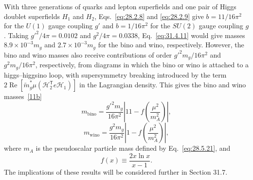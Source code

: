 With three generations of quarks and lepton superfields and one pair of
Higgs doublet superfields \(H_1\) and \(H_2\),
Eqs.~\eqref{eq:28.2.8} and \eqref{eq:28.2.9} give \(b=11/16\pi^2\) for
the \(U(1)\) gauge coupling \(g'\) and \(b=1/16\pi^2\) for the \(SU(2)\)
gauge coupling \(g\). Taking \(g'^2/4\pi=0.0102\) and
\(g^2/4\pi=0.0338\), Eq.~\eqref{eq:31.4.11} would give masses
\(8.9\times10^{-3}m_g\) and \(2.7\times10^{-3}m_g\) for the bino and
wino, respectively. However, the bino and wino masses also receive
contributions of order \(g'^2m_g/16\pi^2\) and \(g^2m_g/16\pi^2\),
respectively, from diagrams in which the bino or wino is attached to a
higgs--higgsino loop, with supersymmetry breaking introduced by the term
\(2\operatorname{Re}
[\widetilde m_g^*\mu(\mathcal H_2^{\mathsf T}e\mathcal H_1)]\)
in the Lagrangian density. This gives the bino and wino
masses~\hyperref[ch31-ref-11b]{[11b]}
\begin{equation}
  m_{\mathrm{bino}}
  =\frac{g'^2m_g}{16\pi^2}
   \left|11-f\left(\frac{\mu^2}{m_A^2}\right)\right|,
  \tag{31.4.15}\label{eq:31.4.15}
\end{equation}
\begin{equation}
  m_{\mathrm{wino}}
  =\frac{g^2m_g}{16\pi^2}
   \left|1-f\left(\frac{\mu^2}{m_A^2}\right)\right|,
  \tag{31.4.16}\label{eq:31.4.16}
\end{equation}
where \(m_A\) is the pseudoscalar particle mass defined by
Eq.~\eqref{eq:28.5.21}, and
\begin{equation}
  f(x)\equiv\frac{2x\ln x}{x-1}.
  \tag{31.4.17}\label{eq:31.4.17}
\end{equation}
The implications of these results will be considered further in Section
31.7.

